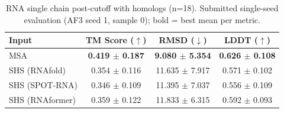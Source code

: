 \begin{table}[htbp]
\centering
\caption{RNA single chain post-cutoff with homologs (n=18). Submitted single-seed evaluation (AF3 seed 1, sample 0); bold = best mean per metric.}
\label{tab:rna_single_chain_post_cutoff_with_homologs}
\begin{tabular}{lccc}
\toprule
Input & TM Score ($\uparrow$) & RMSD ($\downarrow$) & LDDT ($\uparrow$) \\
\midrule
MSA & \textbf{0.419 $\pm$ 0.187} & \textbf{9.080 $\pm$ 5.354} & \textbf{0.626 $\pm$ 0.108} \\
SHS (RNAfold) & 0.354 $\pm$ 0.116 & 11.635 $\pm$ 7.917 & 0.571 $\pm$ 0.102 \\
SHS (SPOT-RNA) & 0.346 $\pm$ 0.109 & 11.395 $\pm$ 7.037 & 0.556 $\pm$ 0.109 \\
SHS (RNAformer) & 0.359 $\pm$ 0.122 & 11.833 $\pm$ 6.315 & 0.592 $\pm$ 0.093 \\
\bottomrule
\end{tabular}
\end{table}
